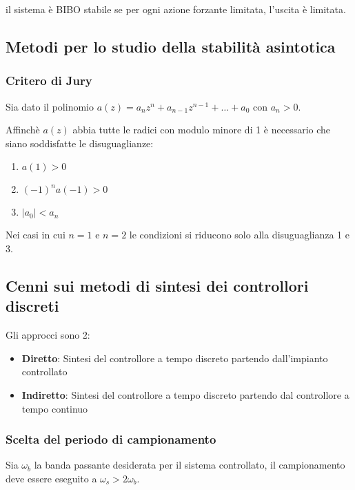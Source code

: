 \begin{definition}
  il sistema è BIBO stabile se per ogni azione forzante limitata, l'uscita è
  limitata.
\end{definition}


\subsection{Metodi per lo studio della stabilità asintotica}

\subsubsection{Critero di Jury}

Sia dato il polinomio $a(z) = a_n z^n + a_{n-1} z^{n-1} + \dots + a_0$ con $a_n > 0$.


Affinchè $a(z)$ abbia tutte le radici con modulo minore di 1 è necessario che
siano soddisfatte le disuguaglianze:
\begin{enumerate}
  \item $a(1) > 0$
  \item $(-1)^n a(-1) > 0$
  \item $|a_0| < a_n$
\end{enumerate}

Nei casi in cui $n=1$ e $n=2$ le condizioni si riducono solo alla
disuguaglianza 1 e 3.


\subsection{Cenni sui metodi di sintesi dei controllori discreti}

Gli approcci sono 2:
\begin{itemize}
  \item \textbf{Diretto}: Sintesi del controllore a tempo discreto partendo dall'impianto controllato
  \item \textbf{Indiretto}: Sintesi del controllore a tempo discreto partendo dal controllore a tempo continuo
\end{itemize}


\subsubsection{Scelta del periodo di campionamento}

Sia $\omega_b$ la banda passante desiderata per il sistema controllato, il
campionamento deve essere eseguito a $\omega_s > 2 \omega_b$.

